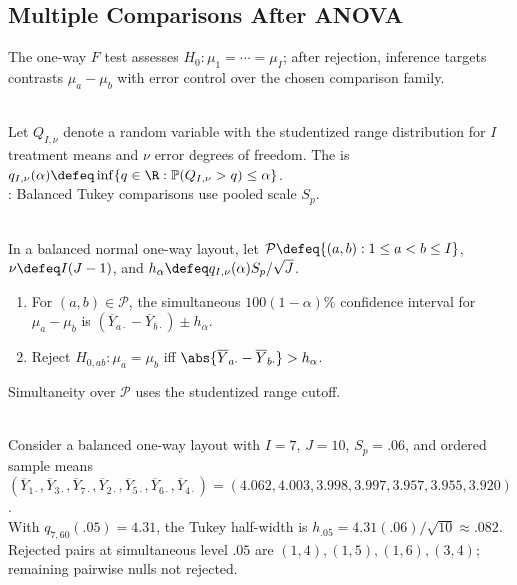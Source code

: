 \subsection{Multiple Comparisons After ANOVA}

The one-way $F$ test assesses $H_0:\mu_1=\cdots=\mu_I$; after rejection, inference targets contrasts $\mu_a-\mu_b$ with error control over the chosen comparison family.

\begin{definition} \label{def:studentized-range-quantile} \\
Let $Q_{I,\nu}$ denote a random variable with the studentized range distribution for $I$ treatment means and $\nu$ error degrees of freedom.
The  is $q_{I,\nu}(\alpha)\defeq \inf\{q\in\R:\mathbb{P}(Q_{I,\nu}>q)\leq \alpha\}$.\\
: Balanced Tukey comparisons use pooled scale $S_p$.
\end{definition}

\begin{method} \label{meth:tukey-pairwise-mean-comparisons} \\
In a balanced normal one-way layout, let $\mathcal{P}\defeq\{(a,b):1\leq a<b\leq I\}$, $\nu\defeq I(J-1)$, and $h_\alpha\defeq q_{I,\nu}(\alpha)S_p/\sqrt J$.
\begin{enumerate}[label=(\roman*)]
\setlength{\itemsep}{0pt}
\item For $(a,b)\in\mathcal{P}$, the simultaneous $100(1-\alpha)\%$ confidence interval for $\mu_a-\mu_b$ is $(\overline{Y}_{a\cdot}-\overline{Y}_{b\cdot})\pm h_\alpha$.
\item Reject $H_{0,ab}:\mu_a=\mu_b$ iff $\abs{\overline{Y}_{a\cdot}-\overline{Y}_{b\cdot}}>h_\alpha$.
\end{enumerate}
Simultaneity over $\mathcal{P}$ uses the studentized range cutoff.
\end{method}

\begin{example} \label{ex:tukey-pairwise-calculation} \\
Consider a balanced one-way layout with $I=7$, $J=10$, $S_p=.06$, and ordered sample means\\
$(\overline{Y}_{1\cdot},\overline{Y}_{3\cdot},\overline{Y}_{7\cdot},\overline{Y}_{2\cdot},\overline{Y}_{5\cdot},\overline{Y}_{6\cdot},\overline{Y}_{4\cdot})=(4.062,4.003,3.998,3.997,3.957,3.955,3.920)$.\\
With $q_{7,60}(.05)=4.31$, the Tukey half-width is $h_{.05}=4.31(.06)/\sqrt{10}\approx.082$.\\
Rejected pairs at simultaneous level $.05$ are $(1,4),(1,5),(1,6),(3,4)$; remaining pairwise nulls not rejected.
\end{example}

